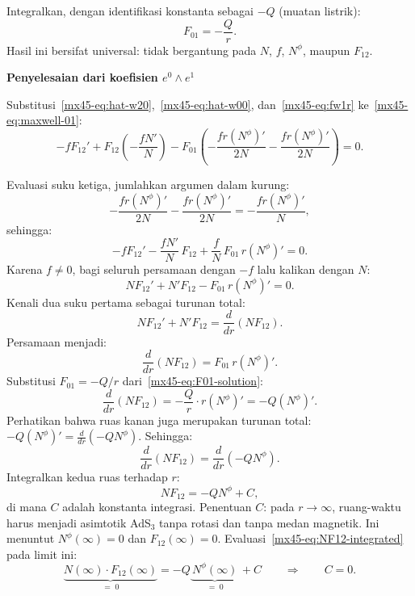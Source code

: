 Integralkan, dengan identifikasi konstanta sebagai $-Q$ (muatan listrik):
\begin{equation}
    F_{01} = -\frac{Q}{r}. \label{mx45-eq:F01-solution}
\end{equation}
Hasil ini bersifat universal: tidak bergantung pada $N$, $f$, $N^\phi$, maupun $F_{12}$.

\vspace{0.5em}
\noindent \textbf{Penyelesaian dari koefisien $e^0 \wedge e^1$}

Substitusi~\eqref{mx45-eq:hat-w20},~\eqref{mx45-eq:hat-w00}, dan~\eqref{mx45-eq:fw1r} ke~\eqref{mx45-eq:maxwell-01}:
\begin{equation}
    -fF_{12}' + F_{12}\!\left(-\frac{fN'}{N}\right)
    - F_{01}\!\left(-\frac{fr(N^\phi)'}{2N} - \frac{fr(N^\phi)'}{2N}\right) = 0.
\end{equation}

Evaluasi suku ketiga, jumlahkan argumen dalam kurung:
\begin{equation}
    -\frac{fr(N^\phi)'}{2N} - \frac{fr(N^\phi)'}{2N}
    = -\frac{fr(N^\phi)'}{N},
\end{equation}
sehingga:
\begin{equation}
    -fF_{12}' - \frac{fN'}{N}\,F_{12}
    + \frac{f}{N}\,F_{01}\,r(N^\phi)' = 0.
\end{equation}
Karena $f \neq 0$, bagi seluruh persamaan dengan $-f$ lalu kalikan dengan $N$:
\begin{equation}
    NF_{12}' + N'F_{12} - F_{01}\,r(N^\phi)' = 0.
\end{equation}
Kenali dua suku pertama sebagai turunan total:
\begin{equation}
    NF_{12}' + N'F_{12} = \frac{d}{dr}(NF_{12}).
\end{equation}
Persamaan menjadi:
\begin{equation}
    \frac{d}{dr}(NF_{12}) = F_{01}\,r(N^\phi)'.
\end{equation}
Substitusi $F_{01} = -Q/r$ dari~\eqref{mx45-eq:F01-solution}:
\begin{equation}
    \frac{d}{dr}(NF_{12}) = -\frac{Q}{r}\cdot r(N^\phi)' = -Q(N^\phi)'.
\end{equation}
Perhatikan bahwa ruas kanan juga merupakan turunan total: $-Q(N^\phi)' = \frac{d}{dr}(-QN^\phi)$. Sehingga:
\begin{equation}
    \frac{d}{dr}(NF_{12}) = \frac{d}{dr}(-QN^\phi).
\end{equation}
Integralkan kedua ruas terhadap $r$:
\begin{equation}
    NF_{12} = -QN^\phi + C, \label{mx45-eq:NF12-integrated}
\end{equation}
di mana $C$ adalah konstanta integrasi. Penentuan $C$: pada $r \to \infty$, ruang-waktu harus menjadi asimtotik AdS$_3$ tanpa rotasi dan tanpa medan magnetik. Ini menuntut $N^\phi(\infty) = 0$ dan $F_{12}(\infty) = 0$. Evaluasi~\eqref{mx45-eq:NF12-integrated} pada limit ini:
\begin{equation}
    \underbrace{N(\infty)\cdot F_{12}(\infty)}_{= \; 0}
    = -Q\!\underbrace{\,N^\phi(\infty)\,}_{= \; 0} + C
    \qquad\Longrightarrow\qquad C = 0.
\end{equation}

